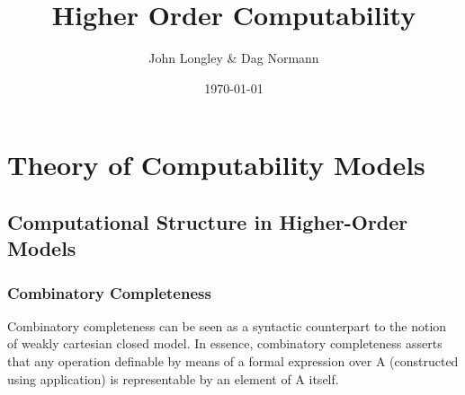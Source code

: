 \documentclass[11pt]{article}
\author{John Longley \& Dag Normann}
\date{\today}
\title{Higher Order Computability}
\begin{document}
\maketitle
\tableofcontents


\section{Theory of Computability Models}
\label{sec:org99ae9fa}
\subsection{Computational Structure in Higher-Order Models}
\label{sec:org430c34d}
\subsubsection{Combinatory Completeness}
\label{sec:orgb024662}
Combinatory completeness can be seen as a syntactic counterpart to the notion of weakly
cartesian closed model. In essence, combinatory completeness asserts that any operation
definable by means of a formal expression over A (constructed using application) is
representable by an element of A itself.
\end{document}
